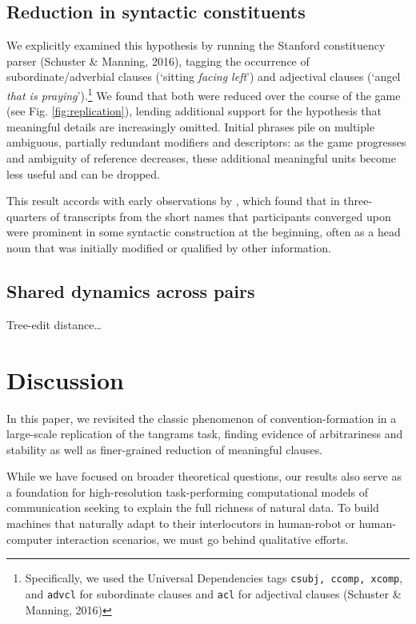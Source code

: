 \subsection{Reduction in syntactic constituents}
We explicitly examined this hypothesis by running the Stanford
constituency parser (Schuster \& Manning, 2016), tagging the occurrence
of subordinate/adverbial clauses (`sitting \emph{facing left}') and
adjectival clauses (`angel \emph{that is praying}').\footnote{Specifically,
  we used the Universal Dependencies tags \texttt{csubj, ccomp, xcomp},
  and \texttt{advcl} for subordinate clauses and \texttt{acl} for
  adjectival clauses (Schuster \& Manning, 2016)} We found that both
were reduced over the course of the game (see Fig.
\ref{fig:replication}), lending additional support for the hypothesis
that meaningful details are increasingly omitted. Initial phrases pile
on multiple ambiguous, partially redundant modifiers and descriptors: as
the game progresses and ambiguity of reference decreases, these
additional meaningful units become less useful and can be dropped.

This result accords with early observations by \cite{Carroll80_NamingHedges}, which found that in three-quarters of transcripts from \cite{KraussWeinheimer64_ReferencePhrases} the short names that participants converged upon were prominent in some syntactic construction at the beginning, often as a head noun that was initially modified or qualified by other information. 

\subsection{Shared dynamics across pairs}

Tree-edit distance\dots


\section{Discussion}\label{general-discussion}

In this paper, we revisited the classic phenomenon of
convention-formation in a large-scale replication of the tangrams task,
finding evidence of arbitrariness and stability as well as finer-grained
reduction of meaningful clauses. 

While we have focused on broader theoretical questions, our results also serve as a foundation for high-resolution task-performing computational models of communication seeking to explain the full richness of natural data. To build machines that naturally adapt to their interlocutors in human-robot or human-computer interaction scenarios, we must go behind qualitative efforts.

